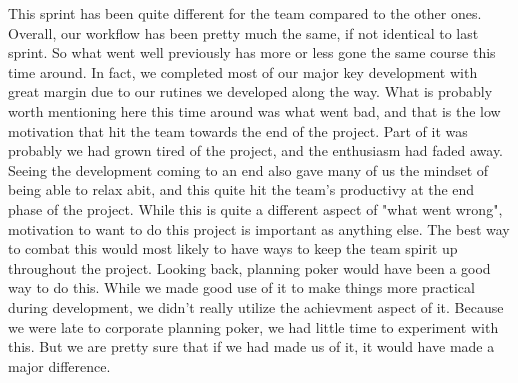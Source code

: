 \documentclass{article}
\begin{document}
\maketitle
This sprint has been quite different for the team compared to the other ones. Overall, our workflow has been pretty much the same, if not identical to last sprint. So what went well previously has more or less gone the same course this time around. In fact, we completed most of our major key development with great margin due to our rutines we developed along the way. What is probably worth mentioning here this time around was what went bad, and that is the low motivation that hit the team towards the end of the project. Part of it was probably we had grown tired of the project, and the enthusiasm had faded away. Seeing the development coming to an end also gave many of us the mindset of being able to relax abit, and this quite hit the team's productivy at the end phase of the project. While this is quite a different aspect of "what went wrong", motivation to want to do this project is important as anything else. The best way to combat this would most likely to have ways to keep the team spirit up throughout the project. Looking back, planning poker would have been a good way to do this. While we made good use of it to make things more practical during development, we didn't really utilize the achievment aspect of it. Because we were late to corporate planning poker, we had little time to experiment with this. But we are pretty sure that if we had made us of it, it would have made a major difference.
\end{document}
